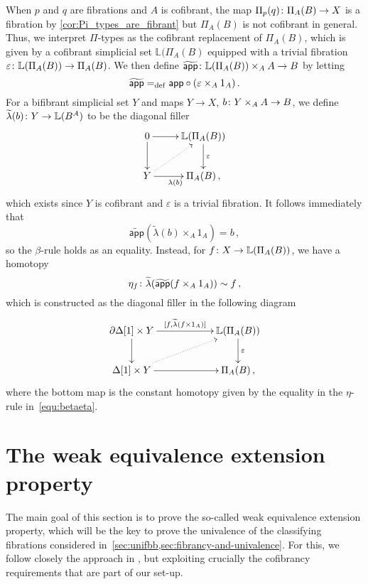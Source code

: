 \documentclass[reqno,10pt,a4paper,oneside,draft]{amsart}
\begin{document}
\begin{remark}
 When $p$ and $q$ are fibrations and $A$ is cofibrant, the map 
 $\Pi_p(q) \colon \Pi_A(B) \to X$ is a fibration by \cref{cor:Pi_types_are_fibrant} but $\Pi_A(B)$ is not cofibrant
 in general. Thus, we interpret  $\Pi$-types as the 
 cofibrant replacement  of $\Pi_A(B)$, which is given by a cofibrant simplicial set
 $\mathbb{L}(\Pi_A(B)$  equipped with
 a trivial fibration $\varepsilon \colon \mathbb{L}(\Pi_A(B)) \to \Pi_A(B)$. 
We then define $\widetilde{\mathsf{app}} \colon   \mathbb{L}(\Pi_A(B)) \times_A A \to B$ by letting
\[
\widetilde{\mathsf{app}}  =_{\operatorname{def}} \mathsf{app} \circ (\varepsilon \times_A 1_A) \, .
\]
For a bifibrant simplicial set $Y$ and maps $Y \to X$,  $b \colon Y \times_A A \to B$, we define $\widetilde{\lambda}(b) \colon Y \to \mathbb{L}(B^A)$ to be the
diagonal filler
\[
\xymatrix{
0 \ar[r] \ar[d] & \mathbb{L}(\Pi_A(B))  \ar[d]^\varepsilon \\
Y \ar[r]_{\lambda(b)} \ar@{.>}[ur] & \Pi_A(B) \, ,}
\]
which exists since $Y$ is cofibrant and $\varepsilon$ is a trivial fibration. It follows immediately that
\[
 \widetilde{\mathsf{app}}(\widetilde{\lambda}(b) \times_A 1_A) = b \, ,
\]
so the $\beta$-rule holds as an equality. Instead, for $f \colon X \to \mathbb{L}(\Pi_A(B))$, we have a homotopy
\[
\eta_f  \colon \widetilde{\lambda}( \widetilde{\mathsf{app}}(f \times_A 1_A)) \sim  f  \, ,
\]
which is constructed as the diagonal filler in the following diagram
\[
\xymatrix@C=2cm{
\partial \Delta[1] \times Y \ar[r]^-{[f, \widetilde{\lambda}(f \times 1_A)]} \ar[d] & \mathbb{L}(\Pi_A(B)) \ar[d]^\varepsilon \\
\Delta[1] \times Y \ar[r] \ar@{.>}[ur] & \Pi_A(B) \, , }
\]
where the bottom map is the constant homotopy given by the equality in the $\eta$-rule in~\eqref{equ:betaeta}.
\end{remark}



\section{The weak equivalence extension property}
\label{sec:equep}

The main goal of this section is to prove the so-called weak equivalence extension property, which will be the key to prove the univalence of the classifying fibrations considered in~\cref{sec:unifbb,sec:fibrancy-and-univalence}.  For this, we follow closely the approach in \cite{voevodsky-simplicial-model}, but exploiting crucially the cofibrancy requirements that are part of our set-up.
\end{document}
